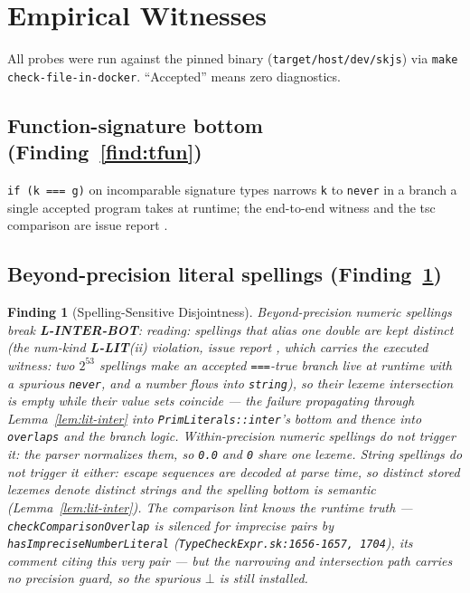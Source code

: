 \documentclass[11pt]{article}
\newtheorem{finding}[theorem]{Finding}
\begin{document}
\section{Empirical Witnesses}
\label{sec:findings}

All probes were run against the pinned binary
(\texttt{target/host/dev/skjs}) via
\texttt{make check-file-in-docker}. ``Accepted'' means zero diagnostics.

\subsection{Function-signature bottom (Finding~\ref{find:tfun})}
\texttt{if (k === g)} on incomparable signature types narrows \texttt{k}
to \texttt{never} in a branch a single accepted program takes at
runtime; the end-to-end witness and the tsc comparison are issue report
.

\subsection{Beyond-precision literal spellings (Finding~\ref{find:spelling})}
\begin{finding}[Spelling-Sensitive Disjointness]
\label{find:spelling}
Beyond-precision numeric spellings break \textbf{L-INTER-BOT}:
reading: spellings that alias one double are kept distinct (the
num-kind \textbf{L-LIT}(ii) violation, issue report
, which carries the
executed witness: two $2^{53}$ spellings make an accepted
\texttt{===}-true branch live at runtime with a spurious \texttt{never},
and a number flows into \texttt{string}), so their lexeme intersection
is empty while their value sets coincide — the failure propagating
through Lemma~\ref{lem:lit-inter} into \texttt{PrimLiterals::inter}'s
bottom and thence into \texttt{overlaps} and the branch logic.
\emph{Within-precision} numeric spellings do not trigger it: the parser
normalizes them, so \texttt{0.0} and \texttt{0} share one lexeme.
\emph{String} spellings do not trigger it either: escape sequences are
decoded at parse time, so distinct stored lexemes denote distinct
strings and the spelling bottom is semantic
(Lemma~\ref{lem:lit-inter}).
The comparison \emph{lint} knows the runtime truth —
\texttt{checkComparisonOverlap} is silenced for imprecise pairs by
\texttt{hasImpreciseNumberLiteral}
(\texttt{TypeCheckExpr.sk:1656-1657, 1704}), its comment citing this
very pair — but the narrowing and intersection path carries no
precision guard, so the spurious $\bot$ is still installed.
\end{finding}
\end{document}
